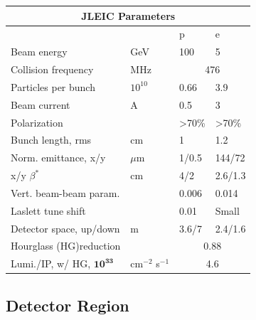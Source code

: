 \begin{center}
	\begin{tabular}{ l l l l } 
		\multicolumn{4}{c}{JLEIC Parameters}  \\ 
		\hline \hline
		& & p & e\\
		\hline
		Beam energy & GeV & 100 & 5 \\ 
		Collision frequency & MHz& \multicolumn{2}{c}{476}\\ 
		Particles per bunch & $10^10$ & 0.66 & 3.9\\
		Beam current & A & 0.5 & 3 \\
		Polarization &  & \textgreater70\% & \textgreater70\%\\
		Bunch length, rms & cm & 1 & 1.2 \\
		Norm. emittance, x/y& $\mu$m & 1/0.5 & 144/72  \\
		x/y $\beta^*$ & cm &4/2 & 2.6/1.3\\
		Vert. beam-beam param.& & 0.006 & 0.014\\
		Laslett tune shift & & 0.01 & Small \\
		Detector space, up/down & m & 3.6/7 & 2.4/1.6 \\
		Hourglass (HG)reduction & & \multicolumn{2}{c}{0.88}\\
		Lumi./IP, w/ HG, $\mathbf{10^{33}}$ & cm$^{-2}$ s$^{-1}$ & \multicolumn{2}{c}{4.6} \\
		\hline
	\end{tabular}
\end{center}

\subsection{Detector Region}

